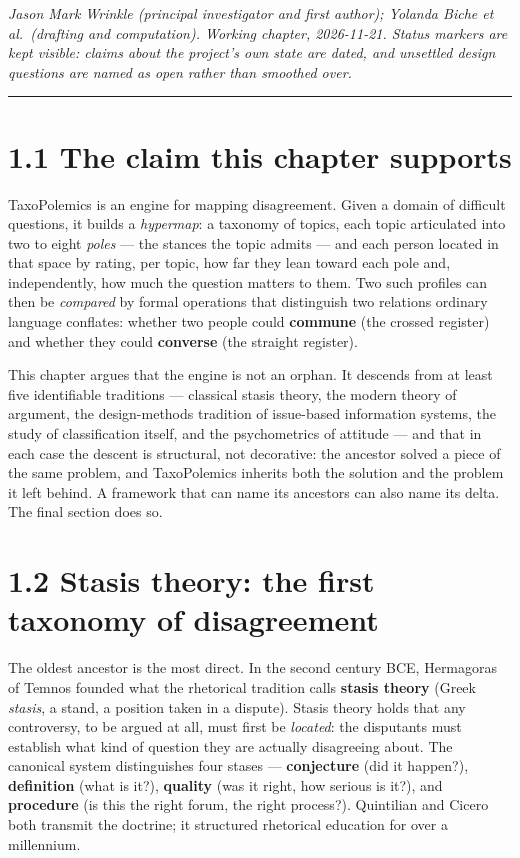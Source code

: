 \emph{Jason Mark Wrinkle (principal investigator and first author);
Yolanda Biche et al.~(drafting and computation). Working chapter,
2026-11-21. Status markers are kept visible: claims about the project's
own state are dated, and unsettled design questions are named as open
rather than smoothed over.}

\begin{center}\rule{0.5\linewidth}{0.5pt}\end{center}

\section{1.1 The claim this chapter
supports}\label{the-claim-this-chapter-supports}

TaxoPolemics is an engine for mapping disagreement. Given a domain of
difficult questions, it builds a \emph{hypermap}: a taxonomy of topics,
each topic articulated into two to eight \emph{poles} --- the stances
the topic admits --- and each person located in that space by rating,
per topic, how far they lean toward each pole and, independently, how
much the question matters to them. Two such profiles can then be
\emph{compared} by formal operations that distinguish two relations
ordinary language conflates: whether two people could \textbf{commune}
(the crossed register) and whether they could \textbf{converse} (the
straight register).

This chapter argues that the engine is not an orphan. It descends from
at least five identifiable traditions --- classical stasis theory, the
modern theory of argument, the design-methods tradition of issue-based
information systems, the study of classification itself, and the
psychometrics of attitude --- and that in each case the descent is
structural, not decorative: the ancestor solved a piece of the same
problem, and TaxoPolemics inherits both the solution and the problem it
left behind. A framework that can name its ancestors can also name its
delta. The final section does so.

\section{1.2 Stasis theory: the first taxonomy of
disagreement}\label{stasis-theory-the-first-taxonomy-of-disagreement}

The oldest ancestor is the most direct. In the second century BCE,
Hermagoras of Temnos founded what the rhetorical tradition calls
\textbf{stasis theory} (Greek \emph{stasis}, a stand, a position taken
in a dispute). Stasis theory holds that any controversy, to be argued at
all, must first be \emph{located}: the disputants must establish what
kind of question they are actually disagreeing about. The canonical
system distinguishes four stases --- \textbf{conjecture} (did it
happen?), \textbf{definition} (what is it?), \textbf{quality} (was it
right, how serious is it?), and \textbf{procedure} (is this the right
forum, the right process?). Quintilian and Cicero both transmit the
doctrine; it structured rhetorical education for over a millennium.

